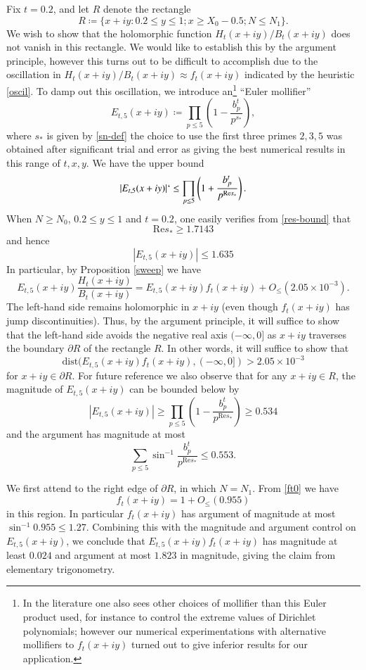 Fix $t=0.2$, and let $R$ denote the rectangle
$$ R \coloneqq \{ x+iy: 0.2 \leq y \leq 1; x \geq X_0 - 0.5; N \leq N_1 \}.$$
We wish to show that the holomorphic function $H_t(x+iy)/B_t(x+iy)$ does not vanish in this rectangle.  We would like to establish this by the argument principle, however this turns out to be difficult to accomplish due to the oscillation in $H_t(x+iy)/B_t(x+iy) \approx f_t(x+iy)$ indicated by the heuristic \eqref{oscil}.  To damp out this oscillation, we introduce an\footnote{In the literature one also sees other choices of mollifier than this Euler product used, for instance to control the extreme values of Dirichlet polynomials; however our numerical experimentations with alternative mollifiers to $f_t(x+iy)$ turned out to give inferior results for our application.} ``Euler mollifier''
$$ E_{t,5}(x+iy) \coloneqq \prod_{p \leq 5} \left( 1 - \frac{b_p^t}{p^{s_*}}\right),$$
where $s_*$ is given by \eqref{sn-def} the choice to use the first three primes $2,3,5$ was obtained after significant trial and error as giving the best numerical results in this range of $t,x,y$.  We have the upper bound
$$
|E_{t,5}(x+iy)| `\leq \prod_{p \leq 5} \left(1 + \frac{b_p^t}{p^{\mathrm{Re} s_*}} \right).
$$
When $N \geq N_0$, $0.2 \leq y \leq 1$ and $t = 0.2$, one easily verifies from \eqref{res-bound} that
$$ \mathrm{Re} s_* \geq 1.7143 $$
and hence
$$ |E_{t,5}(x+iy)| \leq 1.635 $$ %
In particular, by Proposition \ref{sweep} we have
$$ E_{t,5}(x+iy) \frac{H_t(x+iy)}{B_t(x+iy)} = E_{t,5}(x+iy) f_t(x+iy) + O_{\leq}( 2.05 \times 10^{-3} ).$$  %
The left-hand side remains holomorphic in $x+iy$ (even though $f_t(x+iy)$ has jump discontinuities).  Thus, by the argument principle, it will suffice to show that the left-hand side avoids the negative real axis $(-\infty,0]$ as $x+iy$ traverses the boundary $\partial R$ of the rectangle $R$.  In other words, it will suffice to show that
\begin{equation}\label{star}
 \mathrm{dist}( E_{t,5}(x+iy) f_t(x+iy), (-\infty,0]) > 2.05 \times 10^{-3}
\end{equation}
for $x+iy \in\partial R$.
For future reference we also observe that for any $x+iy \in R$,
the magnitude of $E_{t,5}(x+iy)$ can be bounded below by
$$ |E_{t,5}(x+iy)| \geq \prod_{p \leq 5} \left(1 - \frac{b_p^t}{p^{\mathrm{Re} s_*}} \right) \geq 0.534 $$ %
and the argument has magnitude at most
$$ \sum_{p \leq 5} \sin^{-1} \frac{b_p^t}{p^{\mathrm{Re} s_*}} \leq 0.553. $$ %

We first attend to the right edge of $\partial R$, in which $N = N_1$.  
From \eqref{ft0} we have
$$
f_t(x+iy) = 1 + O_{\leq}( 0.955 )$$
in this region.  In particular $f_t(x+iy)$ has argument of magnitude at most $\sin^{-1} 0.955 \leq 1.27$.  Combining this with the magnitude and argument control on $E_{t,5}(x+iy)$, we conclude that $E_{t,5}(x+iy) f_t(x+iy)$ has magnitude at least $0.024$ and argument at most $1.823$ in magnitude, giving the claim from elementary trigonometry.

